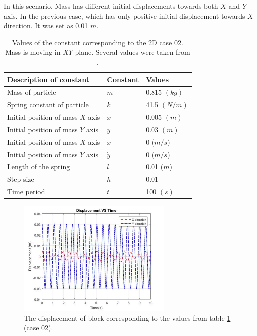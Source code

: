 In this scenario, Mass has different initial displacements towards both $X$ and $Y$ axis. In the previous case, which has only positive initial displacement  towards $X$  direction. It was set as 0.01 $m$. %

 \begin{table}[hbt!]
\begin{center}
    \begin{tabular}{p{6cm}|p{2cm}|p{3cm}}
    \hline
    \textbf{Description of constant} & \textbf{Constant} & \textbf{Values}
    \\
    \hline \hline
    Mass of particle  & $m$ & 0.815 $(kg)$\\
      Spring constant of particle  & $k$ & 41.5 $(N/m)$\\
     Initial position of mass $X$ axis & $x$ & 0.005 $(m)$ \\
     Initial position of mass $Y$ axis  & $y$ & 0.03 $(m)$  \\
     Initial position of mass $X$ axis & $\dot{x}$ & 0 ($m/s$) \\
     Initial position of mass $Y$ axis & $\dot{y}$ & 0 ($m/s$)  \\
     Length of the spring & $l$ & 0.01 ($m$) \\
     Step size & $h$ & 0.01  \\
     Time period & $t$ & 100 $(s)$ \\
     \hline
    \end{tabular}
    \caption{Values of the constant corresponding to the  2D case 02. Mass is moving in $XY$ plane. Several values were taken from \cite{JETIRRes28:online}. }
    \label{tab2D2}
    \end{center}
\end{table}

\newpage

 \begin{figure}[hbt!]
	\centering
	\begin{framed}
	\includegraphics[width=0.66\textwidth]{Figures/2DD2.jpg}
		\end{framed}
	\caption{ The displacement of block corresponding to the values from table \ref{tab2D2} (case 02). }
	\label{fig:221}
\end{figure}

